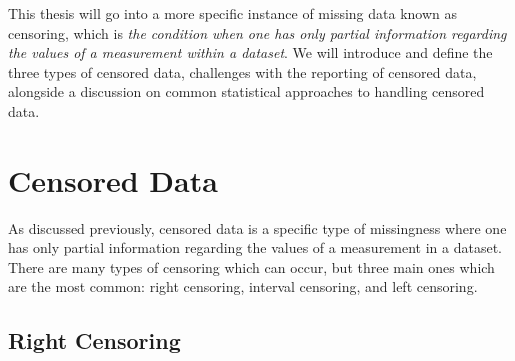 \documentclass[12pt, twoside]{amherstthesis}
\begin{document}
This thesis will go into a more specific instance of missing data known as censoring, which is \emph{the condition when one has only partial information regarding the values of a measurement within a dataset}. We will introduce and define the three types of censored data, challenges with the reporting of censored data, alongside a discussion on common statistical approaches to handling censored data.

\hypertarget{censored_data}{%
\section{Censored Data}\label{censored_data}}

As discussed previously, censored data is a specific type of missingness where one has only partial information regarding the values of a measurement in a dataset. There are many types of censoring which can occur, but three main ones which are the most common: right censoring, interval censoring, and left censoring.

\hypertarget{right}{%
\subsection{Right Censoring}\label{right}}
\end{document}
